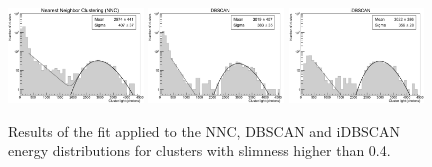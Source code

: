 \documentclass[a4paper,11pt]{article}
\begin{document}
\begin{figure}[ht]
\centering
\includegraphics[width=0.32\textwidth]{log_Resolution_NNC_4.pdf}
\includegraphics[width=0.32\textwidth]{log_Resolution_DBN_4.pdf}
\includegraphics[width=0.32\textwidth]{log_Resolution_IDB_4.pdf}
\caption{Results of the fit applied to the NNC, DBSCAN and iDBSCAN energy distributions for clusters with slimness higher than 0.4.} 
\label{fig_CosFe_slim}
\end{figure}
\end{document}
